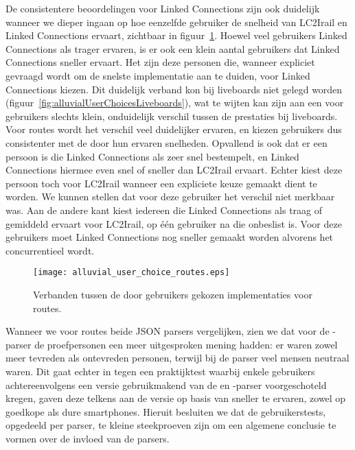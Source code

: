 De consistentere beoordelingen voor Linked Connections zijn ook duidelijk wanneer we dieper ingaan op hoe eenzelfde gebruiker de snelheid van LC2Irail en Linked Connections ervaart, zichtbaar in figuur~\ref{fig:alluvialUserChoicesRoutes}. Hoewel veel gebruikers Linked Connections als trager ervaren, is er ook een klein aantal gebruikers dat Linked Connections sneller ervaart. Het zijn deze personen die, wanneer expliciet gevraagd wordt om de snelste implementatie aan te duiden, voor Linked Connections kiezen. Dit duidelijk verband kon bij liveboards niet gelegd worden (figuur~\ref{fig:alluvialUserChoicesLiveboards}), wat te wijten kan zijn aan een voor gebruikers slechts klein, onduidelijk verschil tussen de prestaties bij liveboards. Voor routes wordt het verschil veel duidelijker ervaren, en kiezen gebruikers dus consistenter met de door hun ervaren snelheden.
Opvallend is ook dat er een persoon is die Linked Connections als zeer snel bestempelt, en Linked Connections hiermee even snel of sneller dan LC2Irail ervaart. Echter kiest deze persoon toch voor LC2Irail wanneer een expliciete keuze gemaakt dient te worden. We kunnen stellen dat voor deze gebruiker het verschil niet merkbaar was. Aan de andere kant kiest iedereen die Linked Connections als traag of gemiddeld ervaart voor LC2Irail, op één gebruiker na die onbeslist is. Voor deze gebruikers moet Linked Connections nog sneller gemaakt worden alvorens het concurrentieel wordt.

\begin{figure}[ht]
	\centering
	\texttt{[image: alluvial\_user\_choice\_routes.eps]}
	\caption[Door gebruikers gekozen implementatie voor routes]{Verbanden tussen de door gebruikers gekozen implementaties voor routes. }
	\label{fig:alluvialUserChoicesRoutes}
\end{figure}

Wanneer we voor routes beide JSON parsers vergelijken, zien we dat voor de -parser de proefpersonen een meer uitgesproken mening hadden: er waren zowel meer tevreden als ontevreden personen, terwijl bij de  parser veel mensen neutraal waren. Dit gaat echter in tegen een praktijktest waarbij enkele gebruikers achtereenvolgens een versie gebruikmakend van de  en -parser voorgeschoteld kregen, gaven deze telkens aan de versie op basis van  sneller te ervaren, zowel op goedkope als dure smartphones. Hieruit besluiten we dat de gebruikerstests, opgedeeld per parser, te kleine steekproeven zijn om een algemene conclusie te vormen over de invloed van de parsers.

